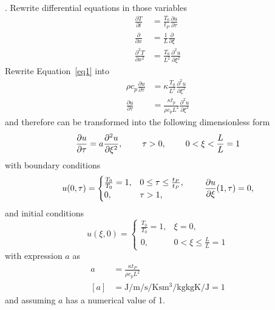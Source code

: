 \documentclass{article}
\begin{document}
. Rewrite differential equations in those variables
\begin{equation*}
\begin{split}
    \frac{\partial T}{\partial t} &= \frac{T_0}{t_P} \frac{\partial u}{\partial \tau} \\
    \frac{\partial}{\partial x} &= \frac{1}{L} \frac{\partial}{\partial \xi} \\
    \frac{\partial^2 T}{\partial x^2} &= \frac{T_0}{L^2} \frac{\partial^2 u}{\partial \xi^2}
\end{split}
\end{equation*}
Rewrite Equation~\ref{eq1} into
\begin{equation*}
\begin{split}
    \rho c_p \frac{\partial u}{\partial \tau} &= \kappa \frac{T_0}{L^2} \frac{\partial^2 u}{\partial \xi^2} \\
    \frac{\partial u}{\partial \tau} &= \frac{\kappa t_p}{\rho c_p L^2} \frac{\partial^2 u}{\partial \xi^2}
\end{split}
\end{equation*}
and therefore can be transformed into the following dimensionless form
\begin{equation*}
    \frac{\partial u}{\partial \tau} = a \frac{\partial^2 u}{\partial \xi^2}, \hspace{0.8cm} \tau > 0, \hspace{0.8cm} 0 < \xi < \frac{L}{L}=1
\end{equation*}
with boundary conditions
\begin{equation*} 
   u(0,\tau)= 
\begin{cases}
    \frac{T_0}{T_0} = 1,           & 0 \leq \tau \leq \frac{t_P}{t_P}, \\
    0,              & \tau > 1,
\end{cases}
   \hspace{0.8cm}         \frac{\partial u}{\partial \xi}(1,\tau) = 0,
\end{equation*}
and initial conditions
\begin{equation*} 
   u(\xi,0) = 
\begin{cases}
    \frac{T_0}{T_0} = 1,           & \xi = 0, \\
    0,              & 0 < \xi \leq \frac{L}{L}=1
\end{cases}
\end{equation*}
with expression $a$ as
\begin{equation*}
\begin{split}
    a &= \frac{\kappa t_P}{\rho c_p L^2} \\
    [a] &= \si{\joule\per\meter\per\second\per\kelvin\second\meter\cubed\per\kilo\gram\kilo\gram\kelvin\per\joule}%
    = 1
\end{split}
\end{equation*}
and assuming $a$ has a numerical value of 1.
\end{document}
